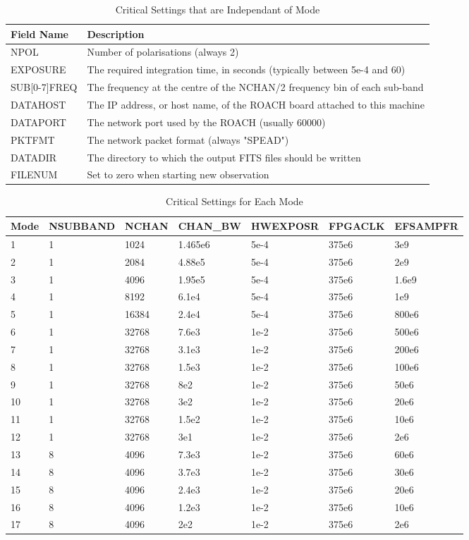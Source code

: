 \documentclass[11pt]{article} %
\begin{document}
\begin{table}[!h]
\centering
\caption{Critical Settings that are Independant of Mode}
\begin{tabular}{| l | l |}
\hline
\bf Field Name & \bf Description \\
\hline
NPOL & Number of polarisations (always 2) \\
EXPOSURE & The required integration time, in seconds (typically between 5e-4 and 60) \\
SUB[0-7]FREQ & The frequency at the centre of the NCHAN/2 frequency bin of each sub-band\\
DATAHOST & The IP address, or host name, of the ROACH board attached to this machine \\
DATAPORT & The network port used by the ROACH (usually 60000) \\
PKTFMT & The network packet format (always "SPEAD") \\
DATADIR & The directory to which the output FITS files should be written \\
FILENUM & Set to zero when starting new observation \\
\hline
\end{tabular}
\label{const-setting-table}
\end{table}

\clearpage

\begin{sidewaystable}[!h]
\centering
\caption{Critical Settings for Each Mode}
\begin{tabular}{| l | l | l | l | l | l | l |}
\hline
\bf Mode & \bf NSUBBAND & \bf NCHAN & \bf CHAN\_BW & \bf HWEXPOSR & \bf FPGACLK & \bf EFSAMPFR \\
\hline
1 & 1 & 1024 & 1.465e6 & 5e-4 & 375e6 & 3e9 \\
2 & 1 & 2084 & 4.88e5 & 5e-4 & 375e6 & 2e9 \\
3 & 1 & 4096 & 1.95e5 & 5e-4 & 375e6 & 1.6e9 \\
4 & 1 & 8192 & 6.1e4 & 5e-4 & 375e6 & 1e9 \\
5 & 1 & 16384 & 2.4e4 & 5e-4 & 375e6 & 800e6 \\
6 & 1 & 32768 & 7.6e3 & 1e-2 & 375e6 & 500e6 \\
7 & 1 & 32768 & 3.1e3 & 1e-2 & 375e6 & 200e6 \\
8 & 1 & 32768 & 1.5e3 & 1e-2 & 375e6 & 100e6 \\
9 & 1 & 32768 & 8e2 & 1e-2 & 375e6 & 50e6 \\
10 & 1 & 32768 & 3e2 & 1e-2 & 375e6 & 20e6 \\
11 & 1 & 32768 & 1.5e2 & 1e-2 & 375e6 & 10e6 \\
12 & 1 & 32768 & 3e1 & 1e-2 & 375e6 & 2e6 \\
13 & 8 & 4096 & 7.3e3 & 1e-2 & 375e6 & 60e6 \\
14 & 8 & 4096 & 3.7e3 & 1e-2 & 375e6 & 30e6 \\
15 & 8 & 4096 & 2.4e3 & 1e-2 & 375e6 & 20e6 \\
16 & 8 & 4096 & 1.2e3 & 1e-2 & 375e6 & 10e6 \\
17 & 8 & 4096 & 2e2 & 1e-2 & 375e6 & 2e6 \\
\hline
\end{tabular}
\label{mode-setting-table}
\end{sidewaystable}
\end{document}
